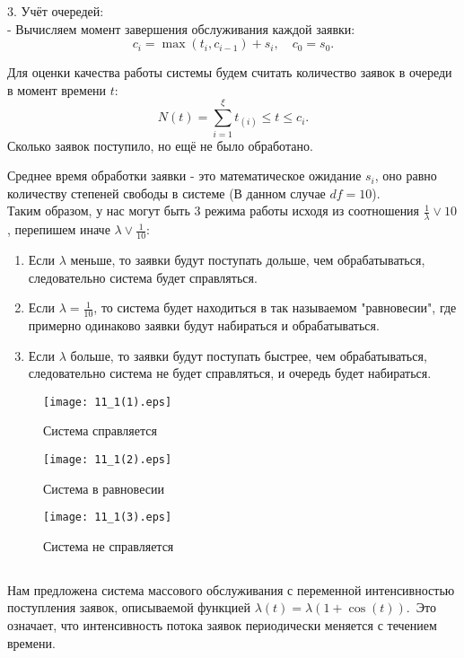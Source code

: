 \documentclass[11pt]{article}
\begin{document}
3. Учёт очередей: \\
   - Вычисляем момент завершения обслуживания каждой заявки:
   $$
   c_i = \max(t_i, c_{i-1}) + s_i, \quad c_0 = s_0.
   $$

Для оценки качества работы системы будем считать количество заявок в очереди в момент времени $t$:
$$
   N(t) = \sum^{\xi}_{i=1} t_{(i)} \leqslant t \leqslant c_i.
$$
Сколько заявок поступило, но ещё не было обработано.

Среднее время обработки заявки - это математическое ожидание $s_i$, оно равно количеству степеней свободы в системе (В данном случае $df=10$). \\
Таким образом, у нас могут быть 3 режима работы исходя из соотношения $\frac{1}{\lambda} \vee 10$, перепишем иначе $\lambda \vee \frac{1}{10}$:
\begin{enumerate}
 \item Если $\lambda$  меньше, то заявки будут поступать дольше, чем обрабатываться, следовательно система будет справляться.
 \item Если $\lambda = \frac{1}{10}$, то система будет находиться в так называемом "равновесии", где примерно одинаково заявки будут набираться и обрабатываться.
 \item Если $\lambda$  больше, то заявки будут поступать быстрее, чем обрабатываться, следовательно система не будет справляться, и очередь будет набираться.
\end{enumerate}  


\begin{figure}[ht]
    \texttt{[image: 11\_1(1).eps]} 
    \caption{Система справляется}
\end{figure} 

\begin{figure}[ht]
    \texttt{[image: 11\_1(2).eps]} 
    \caption{Система в равновесии}
\end{figure} 

\begin{figure}[ht]
    \texttt{[image: 11\_1(3).eps]} 
    \caption{Система не справляется}
\end{figure} 
\FloatBarrier

\subsection{}
Нам предложена система массового обслуживания с переменной интенсивностью поступления заявок, описываемой функцией $\lambda(t)=\lambda(1+\cos(t))$.\
Это означает, что интенсивность потока заявок периодически меняется с течением времени.
\end{document}

